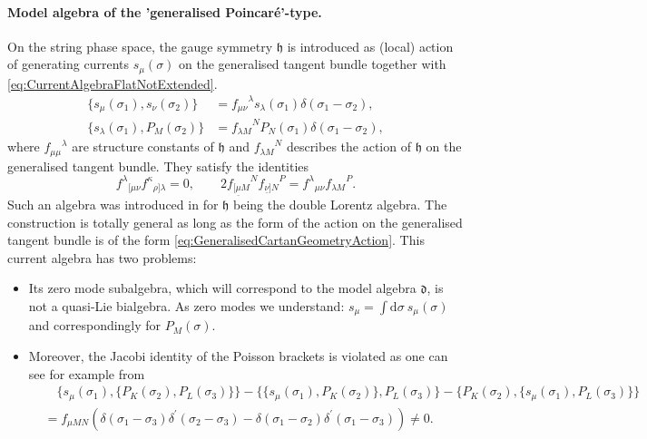 \documentclass[11pt,a4paper]{article}
\numberwithin{equation}{section}
\begin{document}
\paragraph{Model algebra of the 'generalised Poincar\'e'-type.}
On the string phase space, the gauge symmetry $\mathfrak{h}$ is introduced as (local) action of generating currents $s_\mu (\sigma)$ on the generalised tangent bundle together with \eqref{eq:CurrentAlgebraFlatNotExtended}.
\begin{align}
    \{s_\mu(\sigma_1) , s_\nu(\sigma_2)\} &= {f_{\mu \nu}}^\lambda s_\lambda(\sigma_1) \delta(\sigma_1 - \sigma_2), \label{eq:GeneralisedCartanGeometryGauge} \\
    \{ s_\lambda(\sigma_1) , P_M(\sigma_2) \} &= {f_{\lambda M}}^N P_N(\sigma_1) \delta(\sigma_1 - \sigma_2), \label{eq:GeneralisedCartanGeometryAction}
\end{align}
where ${f_{\mu \mu}}^\lambda$ are structure constants of $\mathfrak{h}$ and ${f_{\lambda M}}^N$ describes the action of $\mathfrak{h}$ on the generalised tangent bundle. They satisfy the identities \begin{equation}
    {f^\lambda}_{[\mu \nu} {f^\kappa}_{\rho] \lambda}= 0, \qquad 2 {f_{[\underline{\mu} M}}^N {f_{\underline{\nu}] N}}^P = {f^\lambda}_{\mu \nu}{f_{\lambda M}}^P . \label{eq:JacobiIdentitiesH2}
\end{equation}
Such an algebra was introduced in \cite{Polacek:2013nla} for $\mathfrak{h}$ being the double Lorentz algebra. The construction is totally general as long as the form of the action on the generalised tangent bundle is of the form \eqref{eq:GeneralisedCartanGeometryAction}. This current algebra has two problems:
\begin{itemize}
	\item Its zero mode subalgebra, which will correspond to the model algebra $\mathfrak{d}$, is not a quasi-Lie bialgebra. As zero modes we understand: $s_\mu = \int \mathrm{d} \sigma \ s_\mu(\sigma)$ and correspondingly for $P_M(\sigma)$. 
	\item Moreover, the Jacobi identity of the Poisson brackets is violated as one can see for example from
\begin{align*}
	&{} \quad \{ s_\mu (\sigma_1) , \{ P_K (\sigma_2) , P_L (\sigma_3) \} \} -
	 \{ \{ s_\mu (\sigma_1) , P_K (\sigma_2) \} , P_L (\sigma_3) \} - \{ P_K (\sigma_2) , \{ s_\mu (\sigma_1) , P_L (\sigma_3) \} \} \\
	 &= f_{\mu MN} \left( \delta(\sigma_1 - \sigma_3) \delta^\prime (\sigma_2 - \sigma_3) - \delta(\sigma_1 - \sigma_2) \delta^\prime(\sigma_1 - \sigma_3) \right) \neq 0.
\end{align*}
	\end{itemize}
\end{document}
